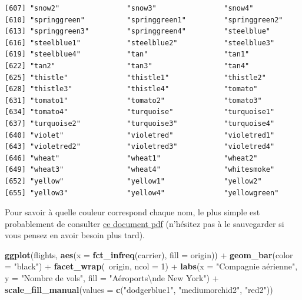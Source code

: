 \documentclass[a4paperpaper,]{article}
\newenvironment{Shaded}{\begin{snugshade}}{\end{snugshade}}
\newcommand{\CharTok}[1]{\textcolor[rgb]{0.57,0.30,0.62}{#1}}
\newcommand{\DataTypeTok}[1]{\textcolor[rgb]{0.00,0.34,0.68}{#1}}
\newcommand{\DecValTok}[1]{\textcolor[rgb]{0.69,0.50,0.00}{#1}}
\newcommand{\KeywordTok}[1]{\textcolor[rgb]{0.12,0.11,0.11}{\textbf{#1}}}
\newcommand{\NormalTok}[1]{\textcolor[rgb]{0.12,0.11,0.11}{#1}}
\newcommand{\OperatorTok}[1]{\textcolor[rgb]{0.12,0.11,0.11}{#1}}
\newcommand{\StringTok}[1]{\textcolor[rgb]{0.75,0.01,0.01}{#1}}
\theoremstyle{definition}
\theoremstyle{definition}
\theoremstyle{definition}
\theoremstyle{remark}
\begin{document}
\begin{verbatim}
[607] "snow2"                "snow3"                "snow4"               
[610] "springgreen"          "springgreen1"         "springgreen2"        
[613] "springgreen3"         "springgreen4"         "steelblue"           
[616] "steelblue1"           "steelblue2"           "steelblue3"          
[619] "steelblue4"           "tan"                  "tan1"                
[622] "tan2"                 "tan3"                 "tan4"                
[625] "thistle"              "thistle1"             "thistle2"            
[628] "thistle3"             "thistle4"             "tomato"              
[631] "tomato1"              "tomato2"              "tomato3"             
[634] "tomato4"              "turquoise"            "turquoise1"          
[637] "turquoise2"           "turquoise3"           "turquoise4"          
[640] "violet"               "violetred"            "violetred1"          
[643] "violetred2"           "violetred3"           "violetred4"          
[646] "wheat"                "wheat1"               "wheat2"              
[649] "wheat3"               "wheat4"               "whitesmoke"          
[652] "yellow"               "yellow1"              "yellow2"             
[655] "yellow3"              "yellow4"              "yellowgreen"         
\end{verbatim}

Pour savoir à quelle couleur correspond chaque nom, le plus simple est
probablement de consulter
\href{http://www.stat.columbia.edu/~tzheng/files/Rcolor.pdf}{ce document
pdf} (n'hésitez pas à le sauvegarder si vous pensez en avoir besoin plus
tard).

\begin{Shaded}
\begin{Highlighting}[]
\KeywordTok{ggplot}\NormalTok{(flights, }\KeywordTok{aes}\NormalTok{(}\DataTypeTok{x =} \KeywordTok{fct_infreq}\NormalTok{(carrier), }\DataTypeTok{fill =}\NormalTok{ origin)) }\OperatorTok{+}
\StringTok{  }\KeywordTok{geom_bar}\NormalTok{(}\DataTypeTok{color =} \StringTok{"black"}\NormalTok{) }\OperatorTok{+}
\StringTok{  }\KeywordTok{facet_wrap}\NormalTok{(}\OperatorTok{~}\NormalTok{origin, }\DataTypeTok{ncol =} \DecValTok{1}\NormalTok{) }\OperatorTok{+}
\StringTok{  }\KeywordTok{labs}\NormalTok{(}\DataTypeTok{x =} \StringTok{"Compagnie aérienne"}\NormalTok{,}
       \DataTypeTok{y =} \StringTok{"Nombre de vols"}\NormalTok{,}
       \DataTypeTok{fill =} \StringTok{"Aéroports}\CharTok{\textbackslash{}n}\StringTok{de New York"}\NormalTok{) }\OperatorTok{+}
\StringTok{  }\KeywordTok{scale_fill_manual}\NormalTok{(}\DataTypeTok{values =} \KeywordTok{c}\NormalTok{(}\StringTok{"dodgerblue1"}\NormalTok{, }\StringTok{"mediumorchid2"}\NormalTok{, }\StringTok{"red2"}\NormalTok{))}
\end{Highlighting}
\end{Shaded}
\end{document}
